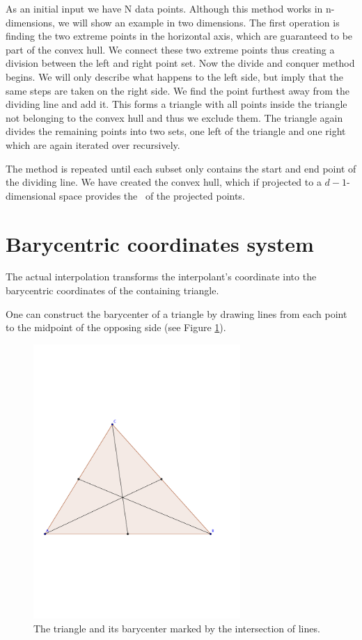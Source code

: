 As an initial input we have N data points. Although this method works in n-dimensions, we will show an example in two dimensions.
The first operation is finding the two extreme points in the horizontal axis, which are guaranteed to be part of the convex hull. 
We connect these two extreme points thus creating a division between the left and right point set. Now the divide and conquer method begins. We will only describe what happens to the left side, but imply that the same steps are taken on the right side. 
We find the point furthest away from the dividing line and add it. This forms a triangle with all points inside the triangle not belonging to the convex hull and thus we exclude them. The triangle again divides the remaining points into two sets, one left of the triangle and one right which are again iterated over recursively. 

The method is repeated until each subset only contains the start and end point of the dividing line. 
We have created the convex hull, which if projected to a $d - 1$-dimensional space provides the \deltri\ of the projected points.



\section{Barycentric coordinates system}

The actual interpolation transforms the interpolant's coordinate into the barycentric coordinates of the containing triangle.

One can construct the barycenter of a triangle by drawing lines from each point to the midpoint of the opposing side (see Figure \ref{fig:tri_barycenter}). 


\begin{figure}[htbp] %
   \centering
   \includegraphics[width=0.7\textwidth]{chapter_ndinterp/plots/barycenter.pdf}
   \caption{The triangle and its barycenter marked by the intersection of lines. }
   \label{fig:tri_barycenter}
\end{figure}


